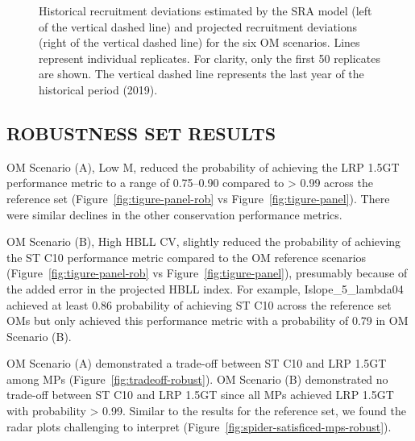 \documentclass[11pt]{book}
\begin{document}
\begin{figure}[htb]

{\centering {} 

}

\caption{Historical recruitment deviations estimated by the SRA model (left of the vertical dashed line) and projected recruitment deviations (right of the vertical dashed line) for the six OM scenarios. Lines represent individual replicates. For clarity, only the first 50 replicates are shown. The vertical dashed line represents the last year of the historical period (2019).}\label{fig:recdev-om-proj}
\end{figure}
\clearpage

\hypertarget{robustness-set-results}{%
\subsection{ROBUSTNESS SET RESULTS}\label{robustness-set-results}}

OM Scenario (A), Low M, reduced the probability of achieving the LRP 1.5GT performance metric to a range of 0.75--0.90 compared to \textgreater{} 0.99 across the reference set (Figure~\ref{fig:tigure-panel-rob} vs Figure~\ref{fig:tigure-panel}). There were similar declines in the other conservation performance metrics.

OM Scenario (B), High HBLL CV, slightly reduced the probability of achieving the ST C10 performance metric compared to the OM reference scenarios (Figure~\ref{fig:tigure-panel-rob} vs Figure~\ref{fig:tigure-panel}), presumably because of the added error in the projected HBLL index. For example, Islope\_5\_lambda04 achieved at least 0.86 probability of achieving ST C10 across the reference set OMs but only achieved this performance metric with a probability of 0.79 in OM Scenario (B).

OM Scenario (A) demonstrated a trade-off between ST C10 and LRP 1.5GT among MPs (Figure~\ref{fig:tradeoff-robust}). OM Scenario (B) demonstrated no trade-off between ST C10 and LRP 1.5GT since all MPs achieved LRP 1.5GT with probability \textgreater{} 0.99. Similar to the results for the reference set, we found the radar plots challenging to interpret (Figure~\ref{fig:spider-satisficed-mps-robust}).
\end{document}
